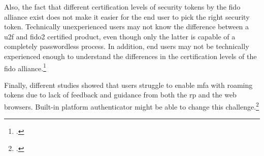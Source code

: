 Also, the fact that different certification levels of security tokens by the \gls{fido} alliance exist does not make it easier for the end user to pick the right security token. Technically unexperienced users may not know the difference between a \gls{u2f} and \gls{fido}2 certified product, even though only the latter is capable of a completely passwordless process. In addition, end users may not be technically experienced enough to understand the differences in the certification levels of the \gls{fido} alliance.\footcites[See][]{fido-certification}

Finally, different studies showed that users struggle to enable \gls{mfa} with roaming tokens due to lack of feedback and guidance from both the \gls{rp} and the web browsers. Built-in platform authenticator might be able to change this challenge.\footcites[See][]{8418643}[See][884]{usabaility-u2f}[See][15]{das2018johnny}